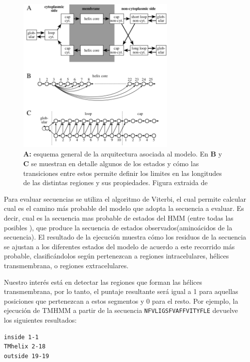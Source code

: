 \begin{figure}[h!,centered]
\centering
\includegraphics[width=0.7\textwidth]{img/tmhmmModel.png} 
\caption{\textbf{A:} esquema general de la arquitectura asociada al modelo. En \textbf{B} y \textbf{C} se muestran en detalle algunos de los estados y cómo las
transiciones entre estos permite definir los limites en las longitudes de las distintas regiones y sus propiedades. Figura extraida de \cite{sonnhammer1998hidden}}
\label{tmhmmModel}
\end{figure}

 
 
Para evaluar secuencias se utiliza el algoritmo de Viterbi, el cual permite calcular cual es el camino más probable del modelo que adopta la secuencia a evaluar. Es decir, cual es la secuencia mas probable de estados del HMM 
(entre todas las posibles ), que produce la secuencia de estados observados(aminoácidos de la secuencia).
El resultado de la ejecución muestra cómo los residuos de la secuencia se ajustan a los diferentes estados del modelo de acuerdo a este recorrido más probable, clasificándolos según pertenezcan a regiones intracelulares, hélices transmembrana, 
o regiones extracelulares. 

Nuestro interés está en detectar las regiones que forman las hélices transmembrana, por lo tanto, el puntaje resultante será igual a 1 para aquellas posiciones que pertenezcan a estos segmentos y 0 para el resto. 
Por ejemplo, la ejecución de TMHMM a partir de la secuencia \texttt{NFVLIGSFVAFFVITYFLE} devuelve los siguientes resultados: 

\texttt{inside         1-1}\\
\indent \texttt{TMhelix   2-18}\\
\indent \texttt{outside	    19-19}\\


